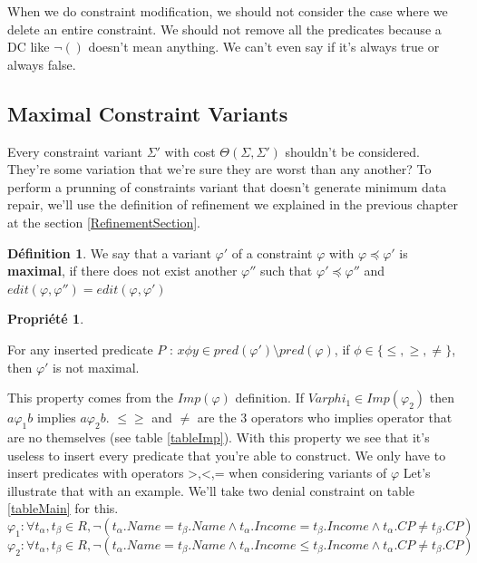 \documentclass[letterpaper, 12pt]{report}
\theoremstyle{definition}
\newtheorem{mydef}{Définition}
\newtheorem{myprop}{Propriété}
\begin{document}
When we do constraint modification, we should not consider the case where we delete an entire constraint.  We should not remove all the predicates because a DC like $\neg()$ doesn't mean anything. We can't even say if it's always true or always false.

\subsection{Maximal Constraint Variants}

	Every constraint variant $\Sigma'$ with cost $\Theta(\Sigma,\Sigma')$ shouldn't be considered. They're some variation that we're sure they are worst than any another? To perform a prunning of constraints variant that doesn't generate minimum data repair, we'll use the definition of refinement we explained in the previous chapter at the section \ref{RefinementSection}.
	
\begin{mydef}\cite{main}
 We say that a variant $\varphi '$ of a constraint $\varphi$ with $\varphi \preceq \varphi'$ is \textbf{maximal}, if there does not exist another $\varphi ''$ such that $\varphi ' \preceq \varphi ''$ and $edit(\varphi,\varphi'') = edit (\varphi,\varphi')$
\end{mydef}

\begin{myprop}\cite{main}

For any inserted predicate $ P $ : $x \phi y \in pred(\varphi ') \setminus pred(\varphi)$, if $\phi \in \{\leq,\geq,\neq \}$, then $\varphi '$ is not maximal.

\end{myprop}

This property comes from the $Imp(\varphi)$ definition. If $Varphi_1 \in Imp(\varphi_2)$ then $a\varphi_1 b$ implies $a \varphi_2 b$. $\leq \geq$ and $\neq$ are the 3 operators who implies operator that are no themselves (see table \ref{tableImp}). With this property we see that it's useless to insert every predicate that you're able to construct. We only have to insert predicates with operators {>,<,=} when considering variants of $\varphi$ Let's illustrate that with an example. We'll take two denial constraint on table \ref{tableMain} for this.
$$\varphi_1 : \forall t_\alpha,t_\beta \in R, \neg( t_\alpha.Name = t_\beta.Name \wedge t_\alpha.Income = t_\beta.Income \wedge t_\alpha.CP \neq t_\beta.CP )$$
$$\varphi_2 : \forall t_\alpha,t_\beta \in R, \neg( t_\alpha.Name = t_\beta.Name \wedge t_\alpha.Income \leq t_\beta.Income \wedge t_\alpha.CP \neq t_\beta.CP )$$
\end{document}
